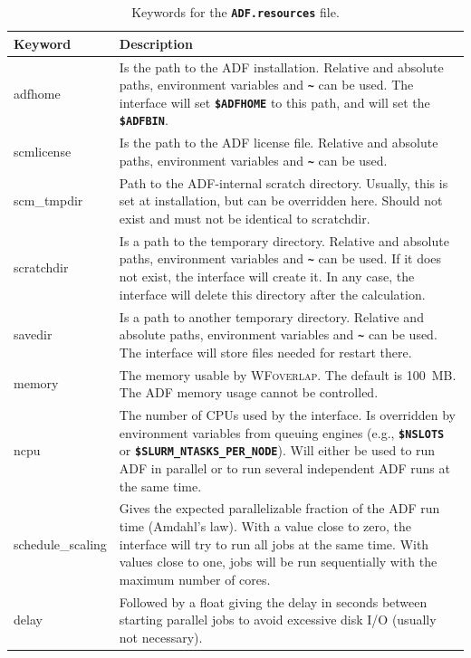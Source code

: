 \documentclass[a4paper,10pt,DIV=15,openany]{scrbook}
\newcommand{\ttt}[1]{\textbf{\texttt{#1}}}
\begin{document}
\begin{table}
  \centering
  \caption{Keywords for the \ttt{ADF.resources} file.}
  \label{tab:adf_sh2}
  \begin{tabular}{>{\ttfamily}lp{12cm}}
  \hline
  Keyword       &Description\\
  \hline
adfhome                 &Is the path to the \textsc{ADF} installation. Relative and absolute paths, environment variables and \ttt{\textasciitilde} can be used. The interface will set \ttt{\$ADFHOME} to this path, and will set the \ttt{\$ADFBIN}.
\\
scmlicense              &Is the path to the \textsc{ADF} license file. Relative and absolute paths, environment variables and \ttt{\textasciitilde} can be used. 
\\
scm\_tmpdir             &Path to the ADF-internal scratch directory. Usually, this is set at installation, but can be overridden here. Should not exist and must not be identical to scratchdir.
\\
scratchdir              &Is a path to the temporary directory. Relative and absolute paths, environment variables and \ttt{\textasciitilde} can be used. If it does not exist, the interface will create it. In any case, the interface will delete this directory after the calculation.
\\
savedir                 &Is a path to another temporary directory.  Relative and absolute paths, environment variables and \ttt{\textasciitilde} can be used. The interface will store files needed for restart there.
\\
memory                  &The memory usable by \textsc{WFoverlap}. The default is 100~MB. The ADF memory usage cannot be controlled.
\\
ncpu                    &The number of CPUs used by the interface. Is overridden by environment variables from queuing engines (e.g., \ttt{\$NSLOTS} or \ttt{\$SLURM\_NTASKS\_PER\_NODE}). Will either be used to run ADF in parallel or to run several independent ADF runs at the same time.
\\
schedule\_scaling       &Gives the expected parallelizable fraction of the ADF run time (Amdahl's law). With a value close to zero, the interface will try to run all jobs at the same time. With values close to one, jobs will be run sequentially with the maximum number of cores.
\\
delay                   &Followed by a float giving the delay in seconds between starting parallel jobs to avoid excessive disk I/O (usually not necessary).

\end{tabular}
\end{table}
\end{document}
